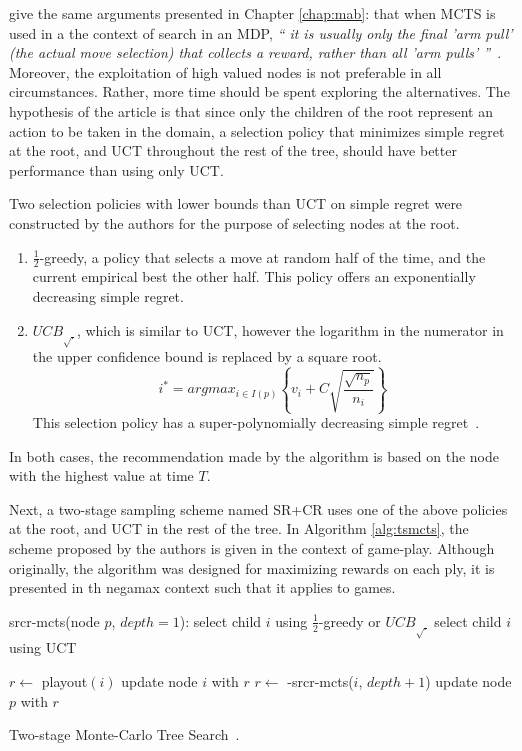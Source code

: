 \documentclass{kecsmstr}
\newcommand{\func}[1]{{\sc #1}}
\begin{document}
 give the same arguments presented in Chapter \ref{chap:mab}: that when MCTS is used in a the context of search in an MDP, \emph{`` it is usually only the final 'arm pull' (the actual move selection) that collects a reward, rather than all 'arm pulls' ''}~. Moreover, the exploitation of high valued nodes is not preferable in all circumstances. Rather, more time should be spent exploring the alternatives. The hypothesis of the article is that since only the children of the root represent an action to be taken in the domain, a selection policy that minimizes simple regret at the root, and UCT throughout the rest of the tree, should have better performance than using only UCT.

Two selection policies with lower bounds than UCT on simple regret were constructed by the authors for the purpose of selecting nodes at the root.
\begin{enumerate}
\item $\frac{1}{2}$-greedy, a policy that selects a move at random half of the time, and the current empirical best the other half. This policy offers an exponentially decreasing simple regret.
\item ${UCB}_{\sqrt{.}}$, which is similar to UCT, however the logarithm in the numerator in the upper confidence bound is replaced by a square root.
\begin{equation}
\label{eq:uctsqrt}
i^* = argmax_{i \in I(p)}\left\{ v_i + C \sqrt{ \frac{\sqrt{n_p}}{n_i}}\right\}
\end{equation}
This selection policy has a super-polynomially decreasing simple regret~.
\end{enumerate}
In both cases, the recommendation made by the algorithm is based on the node with the highest value at time $T$.

Next, a two-stage sampling scheme named SR+CR uses one of the above policies at the root, and UCT in the rest of the tree. In Algorithm \ref{alg:tsmcts}, the scheme proposed by the authors is given in the context of game-play. Although originally, the algorithm was designed for maximizing rewards on each ply, it is presented in th negamax context such that it applies to games.
\IncMargin{1em}
\begin{algorithm2e}[b]
	\func{srcr-mcts}(node $p$, $depth = 1$):														\;
	\Indp							
	 {
	select child $i$ using $\frac{1}{2}$-greedy or ${UCB}_{\sqrt{.}}$								\;
	}
	{
	select child $i$ using UCT 																		\;
	}

     {
    	$r \gets$ {\sc playout}$(i)$ 																\;
    	\func{update} node $i$ with $r$																\;
    }
    {
    	$r \gets$ -\func{srcr-mcts}($i$, $depth + 1$)												\;
    }	
    \func{update} node $p$ with $r$																	\;
	\Indm
  \caption[Two-stage Monte-Carlo Tree Search]{Two-stage Monte-Carlo Tree Search~\protect{}. \label{alg:tsmcts}}
\end{algorithm2e}
\DecMargin{1em}
\end{document}
